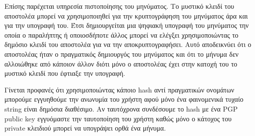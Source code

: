 Επίσης παρέχεται υπηρεσία πιστοποίησης του μηνύματος. Το μυστικό κλειδί του αποστολέα μπορεί να χρησιμοποιηθεί για την κρυπτογράφηση του μηνύματος άρα και για την υπογραφή του. Έτσι δημιουργείται μια ψηφιακή υπογραφή του μηνύματος την οποία ο παραλήπτης ή οποιοσδήποτε άλλος μπορεί να ελέγξει χρησιμοποιώντας το δημόσιο κλειδί του αποστολέα για να την αποκρυπτογραφήσει. Αυτό αποδεικνύει ότι ο αποστολέας ήταν ο πραγματικός δημιουργός του μηνύματος και ότι το μήνυμα δεν αλλοιώθηκε από κάποιον άλλον διότι μόνο ο αποστολέας έχει στην κατοχή του το μυστικό κλειδί που έφτιαξε την υπογραφή.


Γίνεται προφανές ότι χρησιμοποιώντας κάποιο hash αντί πραγματικών ονομάτων μπορούμε εγγυηθούμε την ανωνυμία του χρήστη αφού μόνο ένα φαινομενικά τυχαίο string είναι δημόσια διαθέσιμο. Αν ταυτόχρονα συνδέσουμε το hash με ένα PGP public key εγγυόμαστε την ταυτοποίηση του χρήστη καθώς μόνο ο κάτοχος του private κλειδιού μπορεί να υπογράψει ορθά ένα μήνυμα.
